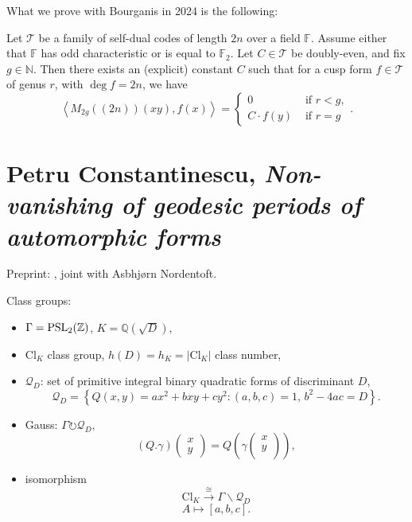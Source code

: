 \documentclass[reqno]{amsart} 
\begin{document}
What we prove with Bourganis in 2024 is the following:
\begin{theorem}
  Let $\mathcal{T}$ be a family of self-dual codes of length $2 n$ over a field $\mathbb{F}$.  Assume either that $\mathbb{F}$ has odd characteristic or is equal to $\mathbb{F}_2$.  Let $C \in \mathcal{T}$ be doubly-even, and fix $g \in \mathbb{N}$.  Then there exists an (explicit) constant $C$ such that for a cusp form $f \in \mathcal{T}$ of genus $r$, with $\deg f = 2 n$, we have
  \begin{equation*}
    \left\langle M_{2 g}((2 n))(x y), f(x) \right\rangle
    =
    \begin{cases}
      0      & \text{ if } r < g, \\
      C \cdot f(y)             & \text{ if } r = g
    \end{cases}.
  \end{equation*}
\end{theorem}

\section{Petru Constantinescu, \textnormal{\emph{Non-vanishing of geodesic periods of automorphic forms}}}
Preprint: \cite{2024arXiv2404.12982}, joint with Asbhj{\o}rn Nordentoft.

Class groups:
\begin{itemize}
\item $\Gamma = \operatorname{PSL}_2(\mathbb{Z})$, $K = \mathbb{Q}(\sqrt{D})$,
\item $\mathrm{Cl}_K$ class group, $h(D) = h_K = \lvert \mathrm{Cl}_K \rvert$ class number,
\item $\mathcal{Q}_D$: set of primitive integral binary quadratic forms of discriminant $D$,
  \begin{equation*}
    \mathcal{Q}_D = \left\{ Q(x, y)
      = a x^2 + b x y + c y^2 :(a, b, c) = 1,
      \,
      b^2 - 4 a c = D\right\}.
  \end{equation*}
\item Gauss: $\Gamma \circlearrowright \mathcal{Q}_D,$
  \begin{equation*}
    (Q . \gamma)
    \begin{pmatrix}
      x      \\
      y
    \end{pmatrix}
    = Q \left( \gamma
      \begin{pmatrix}
        x        \\
        y  \\
      \end{pmatrix} \right),
  \end{equation*}

\item isomorphism
  \begin{equation*}
    \mathrm{Cl}_K \xrightarrow{\cong} \Gamma \backslash \mathcal{Q}_D
  \end{equation*}
  \begin{equation*}
    A \mapsto[a, b, c].
  \end{equation*}
\end{itemize}
\end{document}
